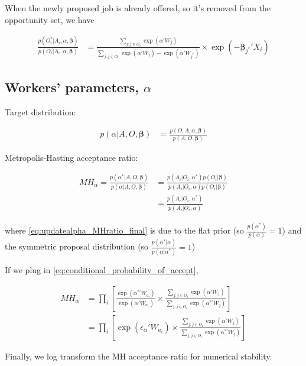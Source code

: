 When the newly proposed job is already offered, so it's removed from the opportunity set, we have

\begin{align}
\frac{p(O_i^* | A_i, \alpha, \bm{\beta})}{p(O_i | A_i, \alpha, \bm{\beta})} &= \frac{\sum\limits_{j:j \in O_i} \exp(\alpha'W_j)}{\sum\limits_{j:j \in O_i} \exp(\alpha'W_j) - \exp(\alpha' W_{j^*})} \times \exp(- \bm{\beta}_{j^*}'X_i)
\end{align}

\subsection{Workers' parameters, $\alpha$}

Target distribution:

\begin{align}
p(\alpha | A, O, \bm{\beta}) &= \frac{p(O, A, \alpha, \bm{\beta})}{p(A, O, \bm{\beta})}
\end{align}

Metropolis-Hasting acceptance ratio:

\begin{align}
MH_\alpha = \frac{p(\alpha^* | A, O, \bm{\beta})}{p(\alpha | A, O, \bm{\beta})} &= \frac{p(A_i | O_i, \alpha^*)p(O_i|\bm{\beta})}{p(A_i | O_i, \alpha)p(O_i|\bm{\beta})} \\
&= \frac{p(A_i | O_i, \alpha^*)}{p(A_i | O_i, \alpha)} \label{eq:updatealpha_MHratio_final}
\end{align}

where \eqref{eq:updatealpha_MHratio_final} is due to the flat prior (so $\frac{p(\alpha^*)}{p(\alpha)}=1$) and the symmetric proposal distribution (so $\frac{p(\alpha^*|\alpha)}{p(\alpha|\alpha^*)} = 1$)

If we plug in \eqref{eq:conditional_probability_of_accept},

\begin{align}
MH_\alpha &= \prod_i \left[ \frac{\exp(\alpha^{*\prime} W_{a_i})}{\exp(\alpha' W_{a_i})} \times \frac{\sum\limits_{j:j \in O_i} \exp(\alpha' W_j)}{\sum\limits_{j:j \in O_i} \exp(\alpha^{*\prime}W_j)} \right] \\
&= \prod_i \left[ \exp(\epsilon_\alpha ' W_{a_i}) \times \frac{\sum\limits_{j:j \in O_i} \exp(\alpha' W_j)}{\sum\limits_{j:j \in O_i} \exp(\alpha^{*\prime}W_j)} \right]
\end{align}

Finally, we log transform the MH acceptance ratio for numerical stability.

